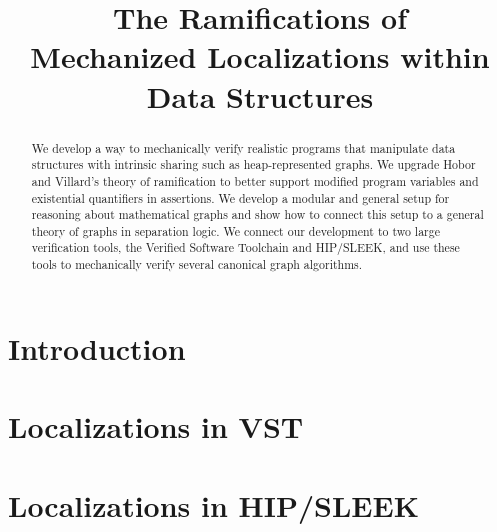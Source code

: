 \documentclass[preprint,10pt, numbers]{sigplanconf}
\begin{document}
\setlength{\pdfpageheight}{\paperheight}
\setlength{\pdfpagewidth}{\paperwidth}

%
%

\title{The Ramifications of \\ Mechanized Localizations within Data Structures}
\authorinfo{} {} {}
\maketitle

\begin{abstract}
We develop a way to mechanically verify realistic programs that manipulate data structures with intrinsic sharing such as heap-represented graphs.  We upgrade Hobor and Villard's theory of ramification to better support modified program variables and existential quantifiers in assertions.  We develop a modular and general setup for reasoning about mathematical graphs and show
how to connect this setup to a general theory of graphs in separation logic.  We connect our development to two large verification tools, the Verified Software Toolchain and HIP/SLEEK, and use these tools to mechanically verify several canonical graph algorithms. %
\end{abstract}

\section{Introduction}
\label{sec:intro}



\section{Localizations in VST}
\label{sec:orientation}



\section{Localizations in HIP/SLEEK}
\label{sec:hipsleek} %
\label{sec:hipsleekmark}
\end{document}
